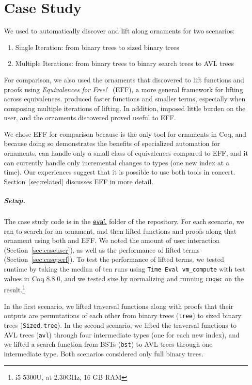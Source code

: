 \section{Case Study}
\label{sec:case}

We used \toolnameb to automatically discover and lift along ornaments for two scenarios:

\begin{enumerate}
\item Single Iteration: from binary trees to sized binary trees
\item Multiple Iterations: from binary trees to binary search trees to AVL trees
\end{enumerate}

For comparison, we also used the ornaments that \toolnameb discovered to lift functions
and proofs using \textit{Equivalences for Free!}~\cite{tabareau2017equivalences} (EFF),
a more general framework for lifting across equivalences.
\toolnameb produced faster functions and smaller terms, especially when composing multiple iterations of lifting.
In addition, \toolnameb imposed little burden on the user, and the ornaments \toolnameb discovered proved useful to EFF.

We chose EFF for comparison because \toolnameb is the only tool for ornaments in Coq,
and because doing so demonstrates the benefits of specialized automation
for ornaments. \toolnameb can handle only a small class of equivalences
compared to EFF, and it can currently handle only incremental changes to types (one new index at a time).
Our experiences suggest that it is possible to use both tools in concert.
Section~\ref{sec:related} discusses EFF in more detail.

\subparagraph*{Setup.}
The case study code is in the \href{http://github.com/uwplse/ornamental-search/tree/itp+equiv/plugin/eval}{\lstinline{eval}} folder of the repository.
For each scenario,
we ran \toolnameb to search for an ornament,
and then lifted functions and proofs along that ornament using both \toolnameb and EFF.
We noted the amount of user interaction (Section~\ref{sec:caseuser}),
as well as the performance of lifted terms (Section~\ref{sec:caseperf}).
To test the performance of lifted terms, we tested runtime by 
taking the median of ten runs using \lstinline{Time Eval vm_compute} with test values in Coq 8.8.0,
and we tested size by normalizing and running \lstinline{coqwc} on the result.\footnote{i5-5300U, at 2.30GHz, 16 GB RAM}

In the first scenario, we lifted traversal functions along with proofs that their outputs are permutations of each other
from binary trees (\lstinline{tree}) to sized binary trees (\lstinline{Sized.tree}).
In the second scenario, we lifted the traversal functions to AVL trees (\lstinline{avl}) through four intermediate
types (one for each new index),
and we lifted a search function from BSTs (\lstinline{bst}) to AVL trees through
one intermediate type. 
Both scenarios considered only full binary trees.

